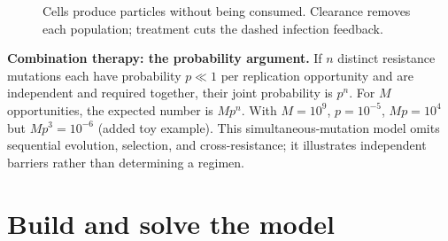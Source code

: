 \begin{figure}[H]
\centering
{}
\caption{Cells produce particles without being consumed. Clearance removes each population; treatment cuts the dashed infection feedback.}\label{fig:hiv-processes}
\end{figure}

\textbf{Combination therapy: the probability argument.} If $n$ distinct resistance mutations each have probability $p\ll1$ per replication opportunity and are independent and required together, their joint probability is $p^n$. For $M$ opportunities, the expected number is $Mp^n$. With $M=10^9$, $p=10^{-5}$, $Mp=10^4$ but $Mp^3=10^{-6}$ (added toy example). This simultaneous-mutation model omits sequential evolution, selection, and cross-resistance; it illustrates independent barriers rather than determining a regimen.

\section{Build and solve the model}\label{sec:hiv-model}
